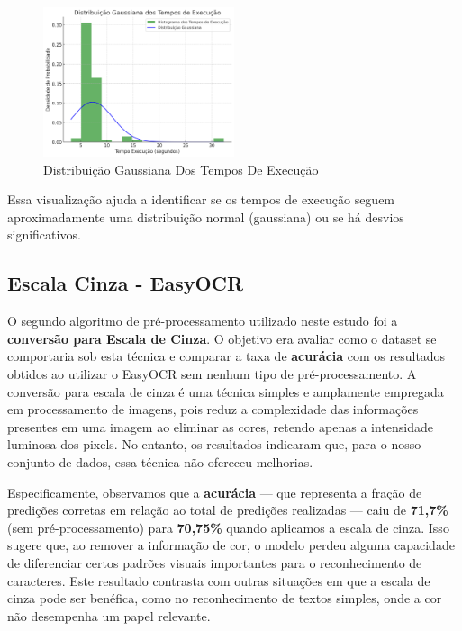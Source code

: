 \documentclass[conference]{IEEEtran}
\begin{document}
\begin{figure}[htbp]
	\centerline{\includegraphics[width=0.5\textwidth]{img6.png}}
	\caption{Distribuição Gaussiana Dos Tempos De Execução}
	\label{img6}
\end{figure}

Essa visualização ajuda a identificar se os tempos de execução seguem aproximadamente uma distribuição normal (gaussiana) ou se há desvios significativos.

\subsection{Escala Cinza - EasyOCR}

O segundo algoritmo de pré-processamento utilizado neste estudo foi a \textbf{conversão para Escala de Cinza}. O objetivo era avaliar como o dataset se comportaria sob esta técnica e comparar a taxa de \textbf{acurácia} com os resultados obtidos ao utilizar o EasyOCR sem nenhum tipo de pré-processamento. A conversão para escala de cinza é uma técnica simples e amplamente empregada em processamento de imagens, pois reduz a complexidade das informações presentes em uma imagem ao eliminar as cores, retendo apenas a intensidade luminosa dos pixels. No entanto, os resultados indicaram que, para o nosso conjunto de dados, essa técnica não ofereceu melhorias.

Especificamente, observamos que a \textbf{acurácia} — que representa a fração de predições corretas em relação ao total de predições realizadas — caiu de \textbf{71,7\%} (sem pré-processamento) para \textbf{70,75\%} quando aplicamos a escala de cinza. Isso sugere que, ao remover a informação de cor, o modelo perdeu alguma capacidade de diferenciar certos padrões visuais importantes para o reconhecimento de caracteres. Este resultado contrasta com outras situações em que a escala de cinza pode ser benéfica, como no reconhecimento de textos simples, onde a cor não desempenha um papel relevante.
\end{document}
